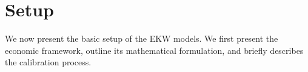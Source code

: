 \section{Setup}
We now present the basic setup of the EKW models. We first present the economic framework, outline its mathematical formulation, and briefly describes the calibration process.






